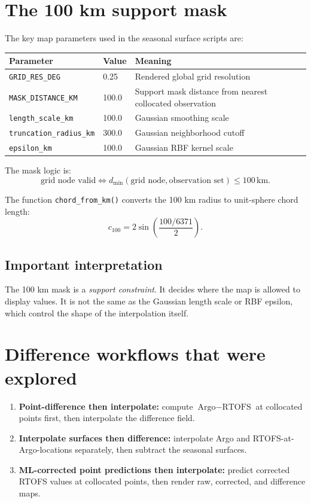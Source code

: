 \documentclass[11pt]{report}
\newcommand{\code}[1]{\texttt{#1}}
\newcommand{\km}{\ensuremath{\,\mathrm{km}}}
\begin{document}
\section{The 100 km support mask}
The key map parameters used in the seasonal surface scripts are:
\begin{table}[H]
\centering
\begin{tabular}{lll}
\toprule
\textbf{Parameter} & \textbf{Value} & \textbf{Meaning} \\
\midrule
\code{GRID\_RES\_DEG} & 0.25 & Rendered global grid resolution \\
\code{MASK\_DISTANCE\_KM} & 100.0 & Support mask distance from nearest collocated observation \\
\code{length\_scale\_km} & 100.0 & Gaussian smoothing scale \\
\code{truncation\_radius\_km} & 300.0 & Gaussian neighborhood cutoff \\
\code{epsilon\_km} & 100.0 & Gaussian RBF kernel scale \\
\bottomrule
\end{tabular}
\end{table}

The mask logic is:
\begin{equation}
\text{grid node valid} \iff d_{\min}(\text{grid node},\text{observation set}) \le 100\km.
\end{equation}

The function \code{chord\_from\_km()} converts the 100 km radius to unit-sphere chord length:
\begin{equation}
c_{100} = 2\sin\left(\frac{100/6371}{2}\right).
\end{equation}

\subsection*{Important interpretation}
The 100 km mask is a \emph{support constraint}. It decides where the map is allowed to display values. It is not the same as the Gaussian length scale or RBF epsilon, which control the shape of the interpolation itself.

\section{Difference workflows that were explored}
\begin{enumerate}[leftmargin=1.4em]
  \item \textbf{Point-difference then interpolate:} compute \(\text{Argo} - \text{RTOFS}\) at collocated points first, then interpolate the difference field.
  \item \textbf{Interpolate surfaces then difference:} interpolate Argo and RTOFS-at-Argo-locations separately, then subtract the seasonal surfaces.
  \item \textbf{ML-corrected point predictions then interpolate:} predict corrected RTOFS values at collocated points, then render raw, corrected, and difference maps.
\end{enumerate}
\end{document}
